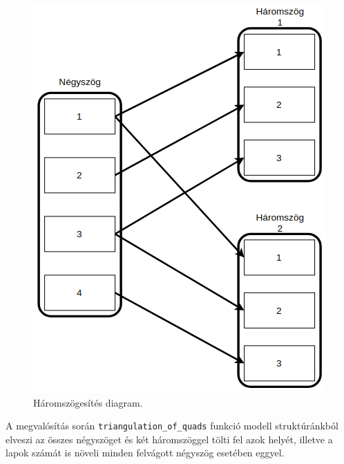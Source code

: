 \begin{figure}[h]
\centering
\includegraphics[scale=0.39]{images/haromszog.png}
\caption{Háromszögesítés diagram.}
\label{fig:tri1}
\end{figure}

A megvalósítás során \texttt{triangulation\_of\_quads} funkció modell struktúránkból elveszi az összes négyszöget és két háromszöggel tölti fel azok helyét, illetve a lapok számát is növeli minden felvágott négyszög esetében eggyel.

